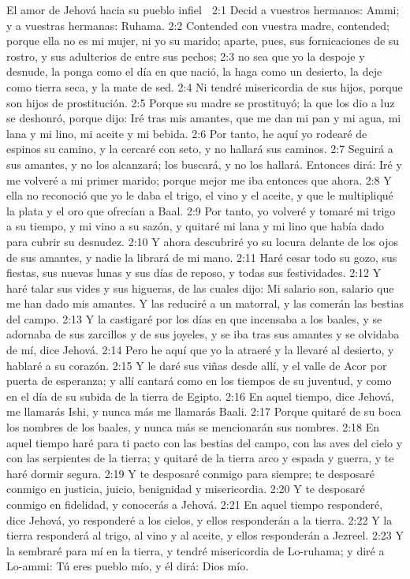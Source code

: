 El amor de Jehová hacia su pueblo infiel  

2:1 Decid a vuestros hermanos: Ammi; y a vuestras hermanas: Ruhama.  
2:2 Contended con vuestra madre, contended; porque ella no es mi mujer, ni yo su marido; aparte, pues, sus fornicaciones de su rostro, y sus adulterios de entre sus pechos;  
2:3 no sea que yo la despoje y desnude, la ponga como el día en que nació, la haga como un desierto, la deje como tierra seca, y la mate de sed.  
2:4 Ni tendré misericordia de sus hijos, porque son hijos de prostitución.  
2:5 Porque su madre se prostituyó; la que los dio a luz se deshonró, porque dijo: Iré tras mis amantes, que me dan mi pan y mi agua, mi lana y mi lino, mi aceite y mi bebida.  
2:6 Por tanto, he aquí yo rodearé de espinos su camino, y la cercaré con seto, y no hallará sus caminos.  
2:7 Seguirá a sus amantes, y no los alcanzará; los buscará, y no los hallará. Entonces dirá: Iré y me volveré a mi primer marido; porque mejor me iba entonces que ahora.  
2:8 Y ella no reconoció que yo le daba el trigo, el vino y el aceite, y que le multipliqué la plata y el oro que ofrecían a Baal.  
2:9 Por tanto, yo volveré y tomaré mi trigo a su tiempo, y mi vino a su sazón, y quitaré mi lana y mi lino que había dado para cubrir su desnudez.  
2:10 Y ahora descubriré yo su locura delante de los ojos de sus amantes, y nadie la librará de mi mano.  
2:11 Haré cesar todo su gozo, sus fiestas, sus nuevas lunas y sus días de reposo, y todas sus festividades.  
2:12 Y haré talar sus vides y sus higueras, de las cuales dijo: Mi salario son, salario que me han dado mis amantes. Y las reduciré a un matorral, y las comerán las bestias del campo.  
2:13 Y la castigaré por los días en que incensaba a los baales, y se adornaba de sus zarcillos y de sus joyeles, y se iba tras sus amantes y se olvidaba de mí, dice Jehová.  
2:14 Pero he aquí que yo la atraeré y la llevaré al desierto, y hablaré a su corazón.  
2:15 Y le daré sus viñas desde allí, y el valle de Acor por puerta de esperanza; y allí cantará como en los tiempos de su juventud, y como en el día de su subida de la tierra de Egipto.  
2:16 En aquel tiempo, dice Jehová, me llamarás Ishi, y nunca más me llamarás Baali.  
2:17 Porque quitaré de su boca los nombres de los baales, y nunca más se mencionarán sus nombres.  
2:18 En aquel tiempo haré para ti pacto con las bestias del campo, con las aves del cielo y con las serpientes de la tierra; y quitaré de la tierra arco y espada y guerra, y te haré dormir segura.  
2:19 Y te desposaré conmigo para siempre; te desposaré conmigo en justicia, juicio, benignidad y misericordia.  
2:20 Y te desposaré conmigo en fidelidad, y conocerás a Jehová.  
2:21 En aquel tiempo responderé, dice Jehová, yo responderé a los cielos, y ellos responderán a la tierra.  
2:22 Y la tierra responderá al trigo, al vino y al aceite, y ellos responderán a Jezreel.  
2:23 Y la sembraré para mí en la tierra, y tendré misericordia de Lo-ruhama; y diré a Lo-ammi: Tú eres pueblo mío, y él dirá: Dios mío.  

